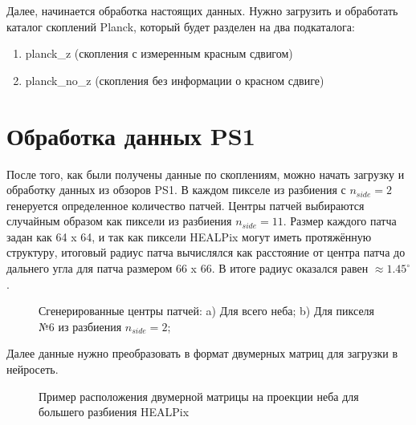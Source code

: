 Далее, начинается обработка настоящих данных. Нужно загрузить и обработать каталог скоплений Planck, 
который будет разделен на два подкаталога: 
\begin{enumerate}
	\item planck\_z (скопления с измеренным красным сдвигом)
	\item planck\_no\_z (скопления без информации о красном сдвиге)
\end{enumerate}

\section{Обработка данных PS1}

После того, как были получены данные по скоплениям, можно начать загрузку и обработку данных из 
обзоров PS1. В каждом пикселе из разбиения с $n_{side}=2$ генеруется определенное количество патчей. 
Центры патчей выбираются случайным образом как пиксели из разбиения $n_{side}=11$. Размер каждого 
патча задан как 64 x 64, и так как пиксели HEALPix могут иметь протяжённую структуру, итоговый 
радиус патча вычислялся как расстояние от центра патча до дальнего угла для патча размером 66 x 66. 
В итоге радиус оказался равен $\approx 1.45^{\circ}$. \\

\begin{figure}[h]
	\begin{minipage}[h]{0.44\linewidth}
	\end{minipage}
	\begin{minipage}[h]{0.44\linewidth}
	\end{minipage}

	\caption{Сгенерированные центры патчей: a) Для всего неба; 
b) Для пикселя №6 из разбиения $n_{side}=2$;}
\end{figure}

Далее данные нужно преобразовать в формат двумерных матриц для загрузки в нейросеть. \\

\begin{figure}[h]
	\caption{Пример расположения двумерной матрицы на проекции неба для большего разбиения HEALPix}
\end{figure}
